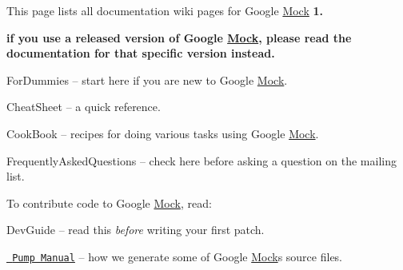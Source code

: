 This page lists all documentation wiki pages for Google \mbox{\hyperlink{classMock}{Mock}} {\bfseries{1.}}
\begin{DoxyItemize}
\item {\bfseries{if you use a released version of Google \mbox{\hyperlink{classMock}{Mock}}, please read the documentation for that specific version instead.}}
\begin{DoxyItemize}
\item For\+Dummies -- start here if you are new to Google \mbox{\hyperlink{classMock}{Mock}}.
\item Cheat\+Sheet -- a quick reference.
\item Cook\+Book -- recipes for doing various tasks using Google \mbox{\hyperlink{classMock}{Mock}}.
\item Frequently\+Asked\+Questions -- check here before asking a question on the mailing list.
\end{DoxyItemize}
\end{DoxyItemize}

To contribute code to Google \mbox{\hyperlink{classMock}{Mock}}, read\+:


\begin{DoxyItemize}
\item Dev\+Guide -- read this {\itshape before} writing your first patch.
\item \href{http://code.google.com/p/googletest/wiki/V1_6_PumpManual}{\texttt{ Pump Manual}} -- how we generate some of Google \mbox{\hyperlink{classMock}{Mock}}\textquotesingle{}s source files. 
\end{DoxyItemize}